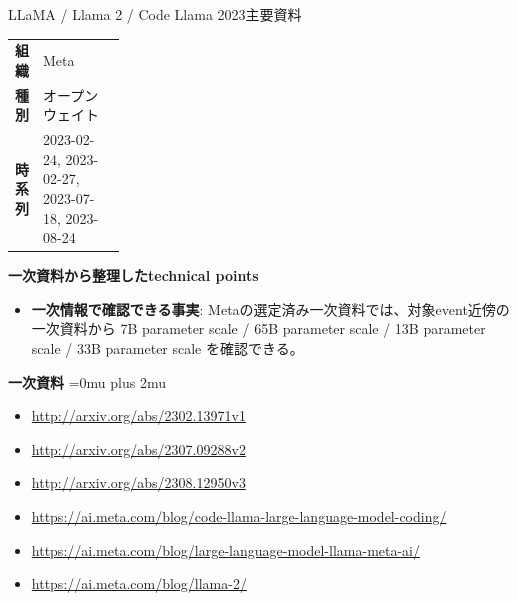 \begin{technicalnote}{LLaMA / Llama 2 / Code Llama 2023}{主要資料}
\begingroup
\begin{tabularx}{\linewidth}{@{}>{\bfseries}p{0.22\linewidth}X@{}}
組織 & Meta \\
種別 & オープンウェイト \\
時系列 & 2023-02-24, 2023-02-27, 2023-07-18, 2023-08-24 \\
\end{tabularx}
\smallskip
{\bfseries 一次資料から整理したtechnical points}
\begin{itemize}[leftmargin=1.5em,itemsep=0.35em]
\item \textbf{一次情報で確認できる事実}: Metaの選定済み一次資料では、対象event近傍の一次資料から 7B parameter scale / 65B parameter scale / 13B parameter scale / 33B parameter scale を確認できる。
\end{itemize}
\begin{minipage}{\linewidth}
\begin{samepage}
{\bfseries 一次資料}
\begingroup\sloppy
\Urlmuskip=0mu plus 2mu\relax
\begin{itemize}[leftmargin=1.5em,itemsep=0.25em]
\item {\scriptsize\url{http://arxiv.org/abs/2302.13971v1}}
\item {\scriptsize\url{http://arxiv.org/abs/2307.09288v2}}
\item {\scriptsize\url{http://arxiv.org/abs/2308.12950v3}}
\item {\scriptsize\url{https://ai.meta.com/blog/code-llama-large-language-model-coding/}}
\item {\scriptsize\url{https://ai.meta.com/blog/large-language-model-llama-meta-ai/}}
\item {\scriptsize\url{https://ai.meta.com/blog/llama-2/}}
\end{itemize}
\endgroup
\end{samepage}
\end{minipage}
\endgroup
\end{technicalnote}
\medskip

